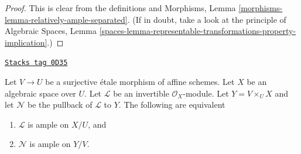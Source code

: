 \begin{proof}
This is clear from the definitions and
Morphisms, Lemma \ref{morphisms-lemma-relatively-ample-separated}.
(If in doubt, take a look at the principle of
Algebraic Spaces, Lemma
\ref{spaces-lemma-representable-transformations-property-implication}.)
\end{proof}

\begin{lemma}
\label{spaces-divisors-lemma-descend-relatively-ample}
\href{https://stacks.math.columbia.edu/tag/0D35}{\texttt{Stacks tag 0D35}}

Let $V \to U$ be a surjective \'etale morphism of affine schemes.
Let $X$ be an algebraic space over $U$.
Let $\mathcal{L}$ be an invertible $\mathcal{O}_X$-module.
Let $Y = V \times_U X$ and let $\mathcal{N}$
be the pullback of $\mathcal{L}$ to $Y$.
The following are equivalent
\begin{enumerate}
\item $\mathcal{L}$ is ample on $X/U$, and
\item $\mathcal{N}$ is ample on $Y/V$.
\end{enumerate}
\end{lemma}

